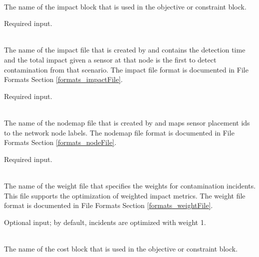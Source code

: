 \begin{description}[topsep=0pt,parsep=0.5em,itemsep=-0.4em]
  \item[{impact data}]\hfill
  \begin{description}[topsep=0pt,parsep=0.5em,itemsep=-0.4em]
    \item[{name}]\hfill
\\The name of the impact block that is used in the objective or constraint block.
                
                Required input.
                
    \item[{impact file}]\hfill
\\The name of the impact file that is created by  and 
                contains the detection time and the total
                impact given a sensor at that node is the first to detect
                contamination from that scenario. 
                The impact file format is documented in File Formats Section \ref{formats_impactFile}.
                
                Required input.
                
    \item[{nodemap file}]\hfill
\\The name of the nodemap file that is created by  and 
                maps sensor placement ids to the network node labels. 
                The nodemap file format is documented in File Formats Section \ref{formats_nodeFile}.
                
                Required input.
                
    \item[{weight file}]\hfill
\\The name of the weight file that specifies the weights for contamination
                incidents. This file supports the optimization of weighted
                impact metrics. 
                The weight file format is documented in File Formats Section \ref{formats_weightFile}.
                
                Optional input; by default, incidents are optimized with weight 1.
  \end{description}

  \item[{cost}]\hfill
  \begin{description}[topsep=0pt,parsep=0.5em,itemsep=-0.4em]
    \item[{name}]\hfill
\\The name of the cost block that is used in the objective or constraint block.
                

\end{description}
\end{description}
